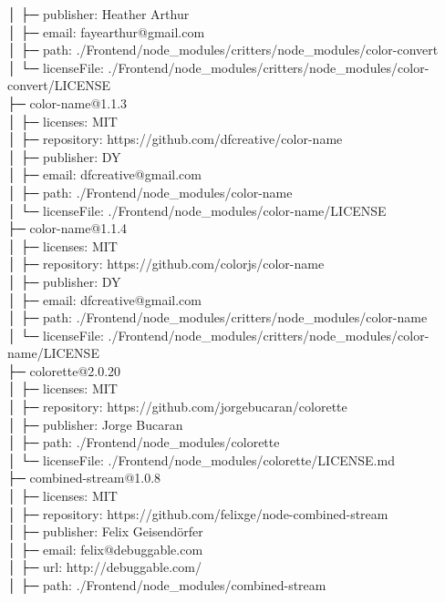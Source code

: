 │  ├─ publisher: Heather Arthur\\
│  ├─ email: fayearthur@gmail.com\\
│  ├─ path: ./Frontend/node\_modules/critters/node\_modules/color-convert\\
│  └─ licenseFile: ./Frontend/node\_modules/critters/node\_modules/color-convert/LICENSE\\
├─ color-name@1.1.3\\
│  ├─ licenses: MIT\\
│  ├─ repository: https://github.com/dfcreative/color-name\\
│  ├─ publisher: DY\\
│  ├─ email: dfcreative@gmail.com\\
│  ├─ path: ./Frontend/node\_modules/color-name\\
│  └─ licenseFile: ./Frontend/node\_modules/color-name/LICENSE\\
├─ color-name@1.1.4\\
│  ├─ licenses: MIT\\
│  ├─ repository: https://github.com/colorjs/color-name\\
│  ├─ publisher: DY\\
│  ├─ email: dfcreative@gmail.com\\
│  ├─ path: ./Frontend/node\_modules/critters/node\_modules/color-name\\
│  └─ licenseFile: ./Frontend/node\_modules/critters/node\_modules/color-name/LICENSE\\
├─ colorette@2.0.20\\
│  ├─ licenses: MIT\\
│  ├─ repository: https://github.com/jorgebucaran/colorette\\
│  ├─ publisher: Jorge Bucaran\\
│  ├─ path: ./Frontend/node\_modules/colorette\\
│  └─ licenseFile: ./Frontend/node\_modules/colorette/LICENSE.md\\
├─ combined-stream@1.0.8\\
│  ├─ licenses: MIT\\
│  ├─ repository: https://github.com/felixge/node-combined-stream\\
│  ├─ publisher: Felix Geisendörfer\\
│  ├─ email: felix@debuggable.com\\
│  ├─ url: http://debuggable.com/\\
│  ├─ path: ./Frontend/node\_modules/combined-stream\\
